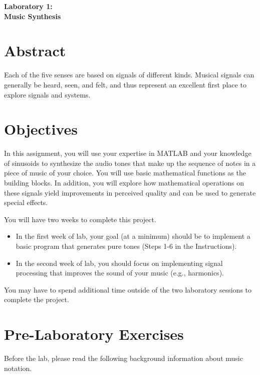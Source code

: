 \documentclass[12pt]{article}
\begin{document}
\begin{center}
\huge{\bf Laboratory 1:}\\
\large{\bf Music Synthesis}
\end{center}

\tableofcontents

\clearpage

\section{Abstract}
Each of the five senses are based on signals of different kinds.  Musical signals can generally be heard, seen, and felt, and thus represent an excellent first place to explore signals and systems. 

\section{Objectives}
In this assignment, you will use your expertise in MATLAB and your knowledge of sinusoids to synthesize the audio tones that make up the sequence of notes in a piece of music of your choice. You will use basic mathematical functions as the building blocks. In addition, you will explore how mathematical operations on these signals yield improvements in perceived quality and can be used to generate special effects.

You will have two weeks to complete this project. 
\begin{itemize}
    \item In the first week of lab, your goal (at a minimum) should be to implement a basic program that generates pure tones (Steps 1-6 in the Instructions). 
    \item In the second week of lab, you should focus on implementing signal processing that improves the sound of your music (e.g., harmonics). 
\end{itemize}
You may have to spend additional time outside of the two laboratory sessions to complete the project.	
\section{Pre-Laboratory Exercises} 
Before the lab, please read the following background information about music notation.  
\end{document}
